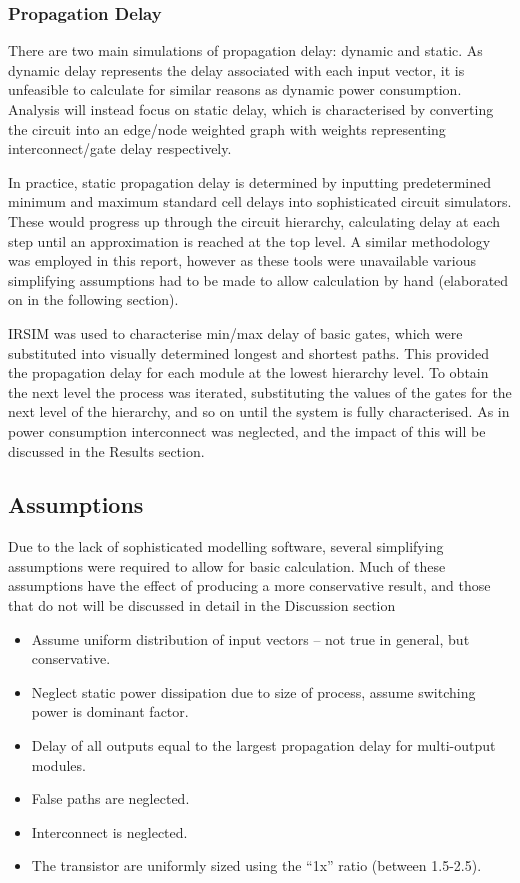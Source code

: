 \documentclass[conference]{IEEEtran}
\begin{document}
\subsubsection{Propagation Delay}
There are two main simulations of propagation delay: dynamic and static. As dynamic delay represents the delay associated with each input vector, it is unfeasible to calculate for similar reasons as dynamic power consumption. Analysis will instead focus on static delay, which is characterised by converting the circuit into an edge/node weighted graph with weights representing interconnect/gate delay respectively.

In practice, static propagation delay is determined by inputting predetermined minimum and maximum standard cell delays into sophisticated circuit simulators. These would progress up through the circuit hierarchy, calculating delay at each step until an approximation is reached at the top level.  A similar methodology was employed in this report, however as these tools were unavailable various simplifying assumptions had to be made to allow calculation by hand (elaborated on in the following section). 

IRSIM was used to characterise min/max delay of basic gates, which were substituted into visually determined longest and shortest paths. This provided the propagation delay for each module at the lowest hierarchy level. To obtain the next level the process was iterated, substituting the values of the gates for the next level of the hierarchy, and so on until the system is fully characterised. As in power consumption interconnect was neglected, and the impact of this will be discussed in the Results section.


\subsection{Assumptions}
Due to the lack of sophisticated modelling software, several simplifying assumptions were required to allow for basic calculation. Much of these assumptions have the effect of producing a more conservative result, and those that do not will be discussed in detail in the Discussion section
\begin{itemize}
\setlength\itemsep{0.5em}
  \item Assume uniform distribution of input vectors – not true in general, but conservative.
  \item Neglect static power dissipation due to size of process, assume switching power is dominant factor.
  \item Delay of all outputs equal to the largest propagation delay for multi-output modules.
  \item False paths are neglected.
  \item Interconnect is neglected.
  \item The transistor are uniformly sized using the “1x” ratio (between 1.5-2.5).
\end{itemize}
\end{document}
